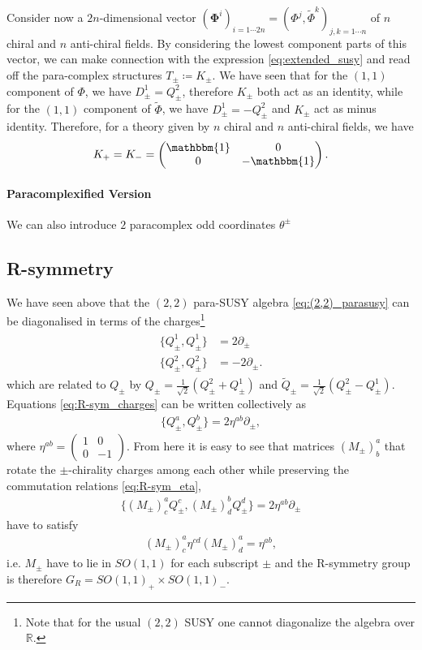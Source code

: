 \documentclass{article}
\newcommand{\RR}{\mathbb{R}}
\newcommand{\id}{\mathbbm{1}}
\newcommand{\p}{\partial}
\def\tl{\tilde}
\theoremstyle{definition}
\theoremstyle{definition}
\theoremstyle{remark}
\begin{document}
Consider now a $2n$-dimensional vector $(\mathbf{\Phi}^i)_{i=1\cdots 2n}=(\Phi^j,\tl{\Phi}^k)_{j,k=1\cdots n}$ of $n$ chiral and $n$ anti-chiral fields. By considering the lowest component parts of this vector, we can make connection with the expression \eqref{eq:extended_susy} and read off the para-complex structures $T_\pm\coloneqq K_\pm$. We have seen that for the $(1,1)$ component of $\Phi$, we have $D^1_\pm=Q^2_\pm$, therefore $K_\pm$ both act as an identity, while for the $(1,1)$ component of $\tl{\Phi}$, we have $D^1_\pm=-Q^2_\pm$ and $K_\pm$ act as minus identity. Therefore, for a theory given by $n$ chiral and $n$ anti-chiral fields, we have
\begin{align*}
K_+=K_-=\begin{pmatrix}
\id & 0 \\
0 & -\id
\end{pmatrix}.
\end{align*}


\paragraph*{Paracomplexified Version}
We can also introduce $2$ paracomplex odd coordinates $\theta^\pm$

\subsection{R-symmetry}
We have seen above that the $(2,2)$ para-SUSY algebra \eqref{eq:(2,2)_parasusy} can be diagonalised in terms of the charges\footnote{Note that for the usual $(2,2)$ SUSY one cannot diagonalize the algebra over $\RR$.}
\begin{align}\label{eq:R-sym_charges}
\begin{aligned}
\{Q_\pm^1,Q_\pm^1\}&=2\p_\pm\\
\{Q_\pm^2,Q_\pm^2\}&=-2\p_\pm.
\end{aligned}
\end{align}
which are related to $Q_\pm$ by $Q_\pm=\frac{1}{\sqrt{2}}(Q^2_\pm+Q^1_\pm)$ and $\tl{Q}_\pm=\frac{1}{\sqrt{2}}(Q^2_\pm-Q^1_\pm)$. Equations \eqref{eq:R-sym_charges} can be written collectively as
\begin{align}\label{eq:R-sym_eta}
\{Q_\pm^a,Q_\pm^b\}=2\eta^{ab}\p_\pm,
\end{align}
where $\eta^{ab}=\begin{pmatrix}
1 & 0 \\
0 & -1
\end{pmatrix}$. From here it is easy to see that matrices $(M_\pm)^a_b$ that rotate the $\pm$-chirality charges among each other while preserving the commutation relations \eqref{eq:R-sym_eta},
\begin{align*}
\{(M_\pm)^a_cQ_\pm^c,(M_\pm)^b_dQ_\pm^d\}=2\eta^{ab}\p_\pm
\end{align*}
have to satisfy
\begin{align*}
(M_\pm)^a_c\eta^{cd}(M_\pm)^a_d=\eta^{ab},
\end{align*}
i.e. $M_\pm$ have to lie in $SO(1,1)$ for each subscript $\pm$ and the R-symmetry group is therefore $G_R=SO(1,1)_+\times SO(1,1)_-$.
\end{document}
